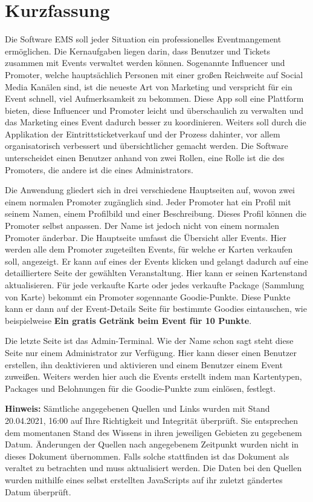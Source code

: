 \chapter{Kurzfassung}
Die Software EMS soll jeder Situation ein professionelles Eventmangement ermöglichen.
Die Kernaufgaben liegen darin, dass Benutzer und Tickets zusammen mit Events verwaltet werden können.
Sogenannte Influencer und Promoter, welche hauptsächlich Personen mit einer großen Reichweite auf Social Media Kanälen sind, ist die neueste Art von Marketing und verspricht für ein Event schnell, viel Aufmerksamkeit zu bekommen.
Diese App soll eine Plattform bieten, diese Influencer und Promoter leicht und überschaulich zu verwalten und das Marketing eines Event dadurch besser zu koordinieren.
Weiters soll durch die Applikation der Eintrittsticketverkauf und der Prozess dahinter, vor allem organisatorisch verbessert und übersichtlicher gemacht werden. 
Die Software unterscheidet einen Benutzer anhand von zwei Rollen, eine Rolle ist die des Promoters, die andere ist die eines Administrators.

Die Anwendung gliedert sich in drei verschiedene Hauptseiten auf, wovon zwei einem normalen Promoter zugänglich sind.
Jeder Promoter hat ein Profil mit seinem Namen, einem Profilbild und einer Beschreibung. Dieses Profil können die Promoter selbst anpassen. Der Name ist jedoch nicht von einem normalen Promoter änderbar.
Die Hauptseite umfasst die Übersicht aller Events. Hier werden alle dem Promoter zugeteilten Events, für welche er Karten verkaufen soll, angezeigt.
Er kann auf eines der Events klicken und gelangt dadurch auf eine detailliertere Seite der gewählten Veranstaltung.
Hier kann er seinen Kartenstand aktualisieren. Für jede verkaufte Karte oder jedes verkaufte Package (Sammlung von Karte) bekommt ein Promoter sogennante Goodie-Punkte.
Diese Punkte kann er dann auf der Event-Details Seite für bestimmte Goodies eintauschen, wie beispielweise \textbf{Ein gratis Getränk beim Event für 10 Punkte}.

Die letzte Seite ist das Admin-Terminal. Wie der Name schon sagt steht diese Seite nur einem Administrator zur Verfügung.
Hier kann dieser einen Benutzer erstellen, ihn deaktivieren und aktivieren und einem Benutzer einem Event zuweißen.
Weiters werden hier auch die Events erstellt indem man Kartentypen, Packages und Belohnungen für die Goodie-Punkte zum einlösen, festlegt.

\textbf{Hinweis:} Sämtliche angegebenen Quellen und Links wurden mit Stand 20.04.2021, 16:00 auf Ihre Richtigkeit und Integrität überprüft.
Sie entsprechen dem momentanen Stand des Wissens in ihren jeweiligen Gebieten zu gegebenem Datum.
Änderungen der Quellen nach angegebenem Zeitpunkt wurden nicht in dieses Dokument übernommen.
Falls solche stattfinden ist das Dokument als veraltet zu betrachten und muss aktualisiert werden.
Die Daten bei den Quellen wurden mithilfe eines selbst erstellten JavaScripts auf ihr zuletzt gändertes Datum überprüft.
